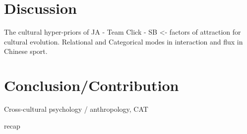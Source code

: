 



























\section{Discussion}



The cultural hyper-priors of JA - Team Click - SB <- factors of attraction for cultural evolution.
Relational and Categorical modes in interaction and flux in Chinese sport.






\section{Conclusion/Contribution}
Cross-cultural psychology / anthropology, CAT

recap
